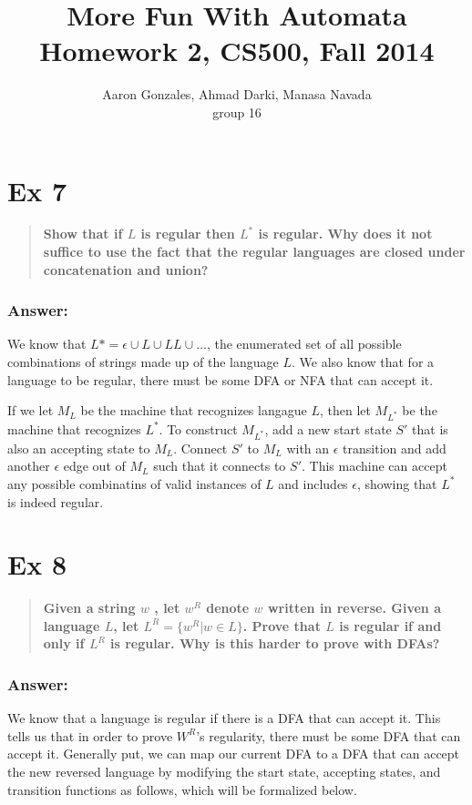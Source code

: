\documentclass[titlepage]{article}\usepackage[]{graphicx}\usepackage[]{color}
\begin{document}
\title{More Fun With Automata \\ Homework 2, CS500, Fall 2014}
\author{Aaron Gonzales, Ahmad Darki, Manasa Navada \\ group 16}
\maketitle


\section*{Ex 7}
\begin{quote}
  \textbf{Show that if $L$ is regular then $L^*$ is regular. Why does it not suffice
  to use the fact that the regular languages are closed under concatenation and
  union?}
\end{quote}
\subsubsection*{Answer:}
We know that $L* = \epsilon \cup L \cup LL \cup \dots$, the enumerated set of
all possible combinations of strings made up of the language $L$. We also know
that for a language to be regular, there must be some DFA or NFA that can
accept it. 

If we let $M_L$ be the machine that recognizes langague $L$, then let $M_{L^*}$
be the machine that recognizes $L^*$. To construct $M_{L^*}$, add a new start
state $S'$ that is also an accepting state to $M_L$. Connect $S'$ to $M_L$ with
an $\epsilon$ transition and add another $\epsilon$ edge out of $M_L$ such that
it connects to $S'$. This machine can accept any possible combinatins of valid
instances of $L$ and includes $\epsilon$, showing that $L^*$ is indeed regular. 



\section*{Ex 8}
\begin{quote}
  \textbf{Given a string $w$ , let $w^R$ denote $w$ written in reverse.
    Given a language $L$, let $L^R = \{w^R | w \in L \}$. Prove that $L$ is regular if and
    only if $L^R$ is regular. Why is this harder to prove with DFAs?}
\end{quote}
\subsubsection{Answer:}
We know that a language is regular if there is a DFA that can accept it. This
tells us that in order to prove $W^R$'s regularity, there must be some DFA that
can accept it. Generally put, we can map our current DFA to a DFA that can
accept the new reversed language by modifying the start state, accepting
states, and transition functions as follows, which will be formalized below.
\end{document}
